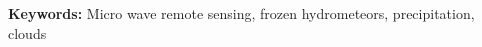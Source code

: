 
\vspace{0.1cm}
\textbf{Keywords:} Micro wave remote sensing, frozen hydrometeors, precipitation, clouds

